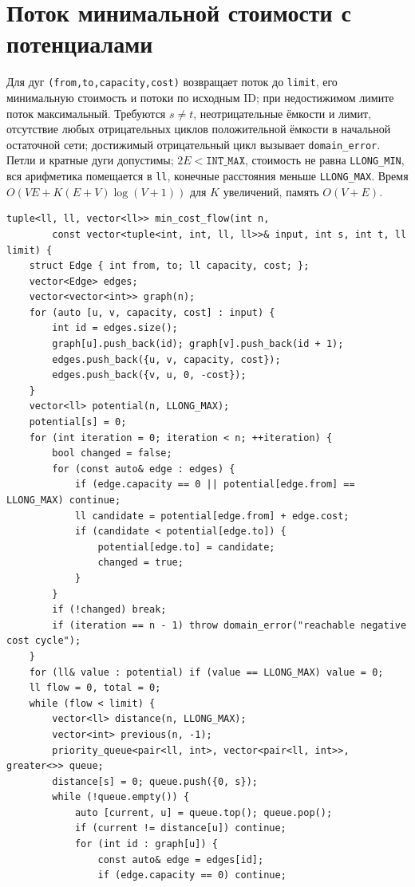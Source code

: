 \section{Поток минимальной стоимости с потенциалами}
Для дуг \texttt{(from,to,capacity,cost)} возвращает поток до \texttt{limit}, его минимальную стоимость и потоки по исходным ID; при недостижимом лимите поток максимальный.
Требуются $s\ne t$, неотрицательные ёмкости и лимит, отсутствие любых отрицательных циклов положительной ёмкости в начальной остаточной сети; достижимый отрицательный цикл вызывает \texttt{domain\_error}.
Петли и кратные дуги допустимы; $2E<\texttt{INT\_MAX}$, стоимость не равна \texttt{LLONG\_MIN}, вся арифметика помещается в \texttt{ll}, конечные расстояния меньше \texttt{LLONG\_MAX}.
Время $O(VE+K(E+V)\log(V+1))$ для $K$ увеличений, память $O(V+E)$.
\begin{lstlisting}[name=advanced_graph_min_cost_flow]
tuple<ll, ll, vector<ll>> min_cost_flow(int n,
        const vector<tuple<int, int, ll, ll>>& input, int s, int t, ll limit) {
    struct Edge { int from, to; ll capacity, cost; };
    vector<Edge> edges;
    vector<vector<int>> graph(n);
    for (auto [u, v, capacity, cost] : input) {
        int id = edges.size();
        graph[u].push_back(id); graph[v].push_back(id + 1);
        edges.push_back({u, v, capacity, cost});
        edges.push_back({v, u, 0, -cost});
    }
    vector<ll> potential(n, LLONG_MAX);
    potential[s] = 0;
    for (int iteration = 0; iteration < n; ++iteration) {
        bool changed = false;
        for (const auto& edge : edges) {
            if (edge.capacity == 0 || potential[edge.from] == LLONG_MAX) continue;
            ll candidate = potential[edge.from] + edge.cost;
            if (candidate < potential[edge.to]) {
                potential[edge.to] = candidate;
                changed = true;
            }
        }
        if (!changed) break;
        if (iteration == n - 1) throw domain_error("reachable negative cost cycle");
    }
    for (ll& value : potential) if (value == LLONG_MAX) value = 0;
    ll flow = 0, total = 0;
    while (flow < limit) {
        vector<ll> distance(n, LLONG_MAX);
        vector<int> previous(n, -1);
        priority_queue<pair<ll, int>, vector<pair<ll, int>>, greater<>> queue;
        distance[s] = 0; queue.push({0, s});
        while (!queue.empty()) {
            auto [current, u] = queue.top(); queue.pop();
            if (current != distance[u]) continue;
            for (int id : graph[u]) {
                const auto& edge = edges[id];
                if (edge.capacity == 0) continue;

\end{lstlisting}
